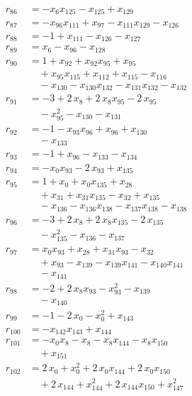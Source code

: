 \begin{align*}
r_{86} &= -x_{6} x_{125} - x_{125} + x_{129} \\
r_{87} &= -x_{96} x_{111} + x_{97} - x_{111} x_{129} - x_{126} \\
r_{88} &= -1 + x_{111} - x_{126} - x_{127} \\
r_{89} &= x_{6} - x_{96} - x_{128} \\
r_{90} &= 1 + x_{92} + x_{92} x_{95} + x_{95} \\
&\quad{}+ x_{95} x_{115} + x_{112} + x_{115} - x_{116} \\
&\quad{}- x_{130} - x_{130} x_{132} - x_{131} x_{132} - x_{132} \\
r_{91} &= -3 + 2\,x_{8} + 2\,x_{8} x_{95} - 2\,x_{95} \\
&\quad{}- x_{95}^{2} - x_{130} - x_{131} \\
r_{92} &= -1 - x_{93} x_{96} + x_{96} + x_{130} \\
&\quad{}- x_{133} \\
r_{93} &= -1 + x_{96} - x_{133} - x_{134} \\
r_{94} &= -x_{0} x_{93} - 2\,x_{93} + x_{135} \\
r_{95} &= 1 + x_{0} + x_{0} x_{135} + x_{28} \\
&\quad{}+ x_{31} + x_{31} x_{135} - x_{32} + x_{135} \\
&\quad{}- x_{136} - x_{136} x_{138} - x_{137} x_{138} - x_{138} \\
r_{96} &= -3 + 2\,x_{8} + 2\,x_{8} x_{135} - 2\,x_{135} \\
&\quad{}- x_{135}^{2} - x_{136} - x_{137} \\
r_{97} &= x_{0} x_{93} + x_{28} + x_{31} x_{93} - x_{32} \\
&\quad{}+ x_{93} - x_{139} - x_{139} x_{141} - x_{140} x_{141} \\
&\quad{}- x_{141} \\
r_{98} &= -2 + 2\,x_{8} x_{93} - x_{93}^{2} - x_{139} \\
&\quad{}- x_{140} \\
r_{99} &= -1 - 2\,x_{0} - x_{0}^{2} + x_{143} \\
r_{100} &= -x_{142} x_{143} + x_{144} \\
r_{101} &= -x_{0} x_{8} - x_{8} - x_{8} x_{144} - x_{8} x_{150} \\
&\quad{}+ x_{151} \\
r_{102} &= 2\,x_{0} + x_{0}^{2} + 2\,x_{0} x_{144} + 2\,x_{0} x_{150} \\
&\quad{}+ 2\,x_{144} + x_{144}^{2} + 2\,x_{144} x_{150} + x_{147}^{2} \\

\end{align*}
